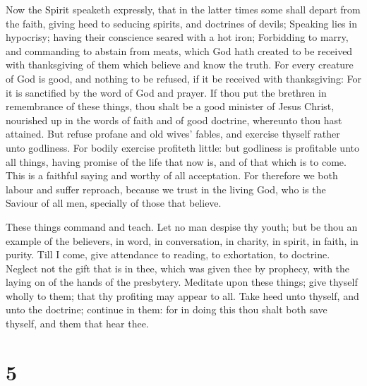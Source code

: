  Now the Spirit speaketh expressly, that in the latter
times some shall depart from the faith, giving heed to seducing spirits,
and doctrines of devils;  Speaking lies in hypocrisy;
having their conscience seared with a hot iron; 
Forbidding to marry, and commanding to abstain from meats, which God
hath created to be received with thanksgiving of them which believe and
know the truth.  For every creature of God is good, and
nothing to be refused, if it be received with thanksgiving:
 For it is sanctified by the word of God and prayer.
 If thou put the brethren in remembrance of these things,
thou shalt be a good minister of Jesus Christ, nourished up in the words
of faith and of good doctrine, whereunto thou hast attained.
 But refuse profane and old wives' fables, and exercise
thyself rather unto godliness.  For bodily exercise
profiteth little: but godliness is profitable unto all things, having
promise of the life that now is, and of that which is to come.
 This is a faithful saying and worthy of all acceptation.
 For therefore we both labour and suffer reproach,
because we trust in the living God, who is the Saviour of all men,
specially of those that believe.

 These things command and teach.  Let no
man despise thy youth; but be thou an example of the believers, in word,
in conversation, in charity, in spirit, in faith, in purity.
 Till I come, give attendance to reading, to exhortation,
to doctrine.  Neglect not the gift that is in thee, which
was given thee by prophecy, with the laying on of the hands of the
presbytery.  Meditate upon these things; give thyself
wholly to them; that thy profiting may appear to all. 
Take heed unto thyself, and unto the doctrine; continue in them: for in
doing this thou shalt both save thyself, and them that hear thee.

\hypertarget{section-4}{%
\section{5}\label{section-4}}

